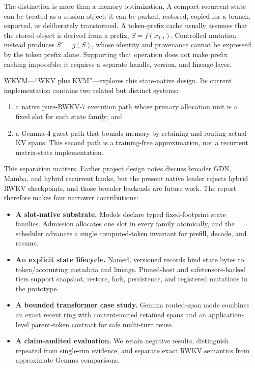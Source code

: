 \documentclass[10pt,letterpaper]{article}
\newcommand{\wkvm}{\textsc{WKVM}}
\begin{document}
The distinction is more than a memory optimization.  A compact recurrent state
can be treated as a session object: it can be parked, restored, copied for a
branch, exported, or deliberately transformed.  A token-prefix cache usually
assumes that the stored object is derived from a prefix, $S=f(x_{1:t})$.
Controlled mutation instead produces $S' = g(S)$, whose identity and provenance
cannot be expressed by the token prefix alone.  Supporting that operation does
not make prefix caching impossible; it requires a separate handle, version, and
lineage layer.

\wkvm---``WKV plus KVM''---explores this state-native design.  Its current
implementation contains two related but distinct systems:

\begin{enumerate}
  \item a native pure-RWKV-7 execution path whose primary allocation unit is a
  fixed slot for each state family; and
  \item a Gemma-4 guest path that bounds memory by retaining and routing actual
  KV spans.  This second path is a training-free approximation, not a recurrent
  matrix-state implementation.
\end{enumerate}

This separation matters.  Earlier project design notes discuss broader GDN,
Mamba, and hybrid recurrent banks, but the present native loader rejects hybrid
RWKV checkpoints, and those broader backends are future work.  The report
therefore makes four narrower contributions:

\begin{itemize}
  \item \textbf{A slot-native substrate.}  Models declare typed fixed-footprint
  state families.  Admission allocates one slot in every family atomically, and
  the scheduler advances a single computed-token invariant for prefill, decode,
  and resume.
  \item \textbf{An explicit state lifecycle.}  Named, versioned records bind
  state bytes to token/accounting metadata and lineage.  Pinned-host and
  safetensors-backed tiers support snapshot, restore, fork, persistence, and
  registered mutations in the prototype.
  \item \textbf{A bounded transformer case study.}  Gemma routed-span mode
  combines an exact recent ring with content-routed retained spans and an
  application-level parent-token contract for safe multi-turn reuse.
  \item \textbf{A claim-audited evaluation.}  We retain negative results,
  distinguish repeated from single-run evidence, and separate exact RWKV
  semantics from approximate Gemma comparisons.
\end{itemize}
\end{document}

